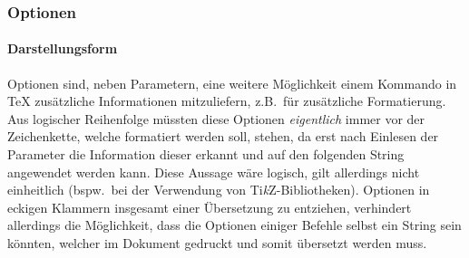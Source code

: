 
\subsubsection{Optionen}\par
\paragraph*{Darstellungsform}\par
Optionen sind, neben Parametern, eine weitere Möglichkeit einem Kommando in \TeX{} zusätzliche Informationen mitzuliefern, z.B.\ für zusätzliche Formatierung. Aus logischer Reihenfolge müssten diese Optionen \textit{eigentlich} immer vor der Zeichenkette, welche formatiert werden soll, stehen, da erst nach Einlesen der Parameter die Information dieser erkannt und auf den folgenden String angewendet werden kann.%
Diese Aussage wäre logisch, gilt allerdings nicht einheitlich (bspw.\ bei der Verwendung von Ti\textit{k}Z-Bibliotheken). Optionen in eckigen Klammern insgesamt einer Übersetzung zu entziehen, verhindert allerdings die Möglichkeit, dass die Optionen einiger Befehle selbst ein String sein könnten, welcher im Dokument gedruckt und somit übersetzt werden muss.


\begin{comment}
\subparagraph*{Beispiele:}\par
\subparagraph*{Muster:}\par
Die hier anfallenden Fehler äußern sich in sechs Permutationen, in welchen immer nur ein String (\texttt{translatable}) übersetzt werden darf und ein weiterer String  (\texttt{non-translatable}) nicht.
Sie zeigen sich in 
\verb|\command[non-translatable] translatable|, \pdfcomment{bspw.\ \marginpar[translatable] text, benötigt logischerweise den Platz dafür}  
\verb|\command[translatable] translatable| \pdfcomment{bspw.\ \item[translatable] text} 
\verb|\command[non-translatable]{non-translatable}|, 
\verb|\command[non-translatable]{translatable}|, 
\verb|\command[translatable]{non-translatable}|, oder
\verb|\command[translatable]{translatable}|
und sind anhand spezifischer Kommandos erkennbar.
\end{comment}

